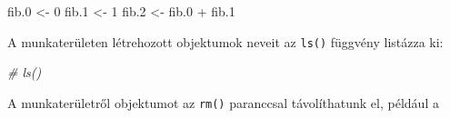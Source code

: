 \documentclass[
]{book}
\newenvironment{Shaded}{\begin{snugshade}}{\end{snugshade}}
\newcommand{\CommentTok}[1]{\textcolor[rgb]{0.56,0.35,0.01}{\textit{#1}}}
\newcommand{\DecValTok}[1]{\textcolor[rgb]{0.00,0.00,0.81}{#1}}
\newcommand{\FloatTok}[1]{\textcolor[rgb]{0.00,0.00,0.81}{#1}}
\newcommand{\NormalTok}[1]{#1}
\newcommand{\OtherTok}[1]{\textcolor[rgb]{0.56,0.35,0.01}{#1}}
\newcommand{\SpecialCharTok}[1]{\textcolor[rgb]{0.00,0.00,0.00}{#1}}
\begin{document}
\begin{Shaded}
\begin{Highlighting}[]
\NormalTok{fib}\FloatTok{.0} \OtherTok{\textless{}{-}} \DecValTok{0}
\NormalTok{fib}\FloatTok{.1} \OtherTok{\textless{}{-}} \DecValTok{1}
\NormalTok{fib}\FloatTok{.2} \OtherTok{\textless{}{-}}\NormalTok{ fib}\FloatTok{.0} \SpecialCharTok{+}\NormalTok{ fib}\FloatTok{.1}
\end{Highlighting}
\end{Shaded}

A munkaterületen létrehozott objektumok neveit az \texttt{ls()} függvény listázza ki:

\begin{Shaded}
\begin{Highlighting}[]
\CommentTok{\# ls()}
\end{Highlighting}
\end{Shaded}

A munkaterületről objektumot az \texttt{rm()} paranccsal távolíthatunk el, például a
\end{document}
